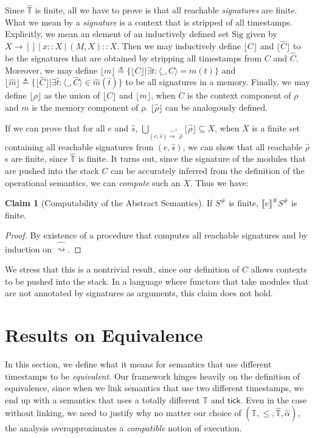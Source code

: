 \documentclass{article}
\theoremstyle{definition}
\newtheorem{clm}{Claim}[section]
\newcommand*{\A}[1]{\widehat{#1}}
\newcommand*{\Abs}[1]{{#1}^{\#}}
\newcommand*{\Time}{\mathbb{T}}
\newcommand*{\ATime}{\A{\Time}}
\newcommand*{\Sig}{\text{Sig}}
\newcommand*{\semarrow}{\rightsquigarrow}
\newcommand*{\asemarrow}{\widehat{\rightsquigarrow}}
\newcommand*{\sembracket}[1]{\lBrack{#1}\rBrack}
\newcommand*{\tick}{\mathsf{tick}}
\begin{document}
Since $\ATime$ is finite, all we have to prove is that all reachable \emph{signatures} are finite.
What we mean by a \emph{signature} is a context that is stripped of all timestamps.
Explicitly, we mean an element of an inductively defined set $\Sig$ given by $X\rightarrow []\:|\:x::X\:|\:(M,X)::X$.
Then we may inductively define $\lfloor C\rfloor$ and $\lfloor \A{C}\rfloor$ to be the signatures that are obtained by stripping all timestamps from $C$ and $\A{C}$.
Moreover, we may define $\lfloor m\rfloor\triangleq\{\lfloor C\rfloor|\exists t:\langle\_,C\rangle=m(t)\}$ and $\lfloor\A{m}\rfloor\triangleq\{\lfloor\A{C}\rfloor|\exists\A{t}:\langle\_,\A{C}\rangle\in\A{m}(\A{t})\}$ to be all signatures in a memory.
Finally, we may define $\lfloor\rho\rfloor$ as the union of $\lfloor C\rfloor$ and $\lfloor m\rfloor$, when $C$ is the context component of $\rho$ and $m$ is the memory component of $\rho$.
$\lfloor\A\rho\rfloor$ can be analogously defined.

If we can prove that for all $e$ and $\A{s}$, $\bigcup_{(e,\A{s})\A\semarrow^*\A\rho}\lfloor\A\rho\rfloor\subseteq X$, when $X$ is a finite set containing all reachable signatures from $(e,\A{s})$, we can show that all reachable $\A\rho$s are finite, since $\ATime$ is finite.
It turns out, since the signature of the modules that are pushed into the stack $C$ can be accurately inferred from the definition of the operational semantics, we can \emph{compute} such an $X$.
Thus we have:
\begin{clm}[Computability of the Abstract Semantics]
  If $\Abs{S}$ is finite, $\Abs{\sembracket{e}}\Abs{S}$ is finite.
\end{clm}
\begin{proof}
  By existence of a procedure that computes all reachable signatures and by induction on $\asemarrow$.
\end{proof}

We stress that this is a nontrivial result, since our definition of $C$ allows contexts to be pushed into the stack.
In a language where functors that take modules that are not annotated by signatures as arguments, this claim does not hold.

\section{Results on Equivalence}
In this section, we define what it means for semantics that use different timestamps to be \emph{equivalent}.
Our framework hinges heavily on the definition of equivalence, since when we link semantics that use two different timestamps, we end up with a semantics that uses a totally different $\Time$ and $\tick$.
Even in the case without linking, we need to justify why no matter our choice of $(\Time,\le,\ATime,\A\alpha)$, the analysis overapproximates a \emph{compatible} notion of execution.
\end{document}
